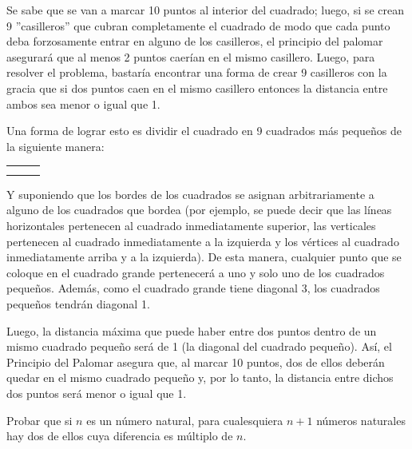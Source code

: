 \documentclass[12pt]{article}
\begin{document}
\begin{solucion}
    Se sabe que se van a marcar 10 puntos al interior del cuadrado; luego, si se crean 9 ''casilleros'' que cubran completamente el cuadrado de modo que cada punto deba forzosamente entrar en alguno de los casilleros, el principio del palomar asegurará que al menos 2 puntos caerían en el mismo casillero. Luego, para resolver el problema, bastaría encontrar una forma de crear 9 casilleros con la gracia que si dos puntos caen en el mismo casillero entonces la distancia entre ambos sea menor o igual que 1.
    
    \newpage
    
    Una forma de lograr esto es dividir el cuadrado en 9 cuadrados más pequeños de la siguiente manera:

    \begin{center}
        \begin{tabular}{|p{0.35cm}|p{0.35cm}|p{0.35cm}|}
        \hline
         &  &  \\ \hline
         &  &  \\ \hline
         &  &  \\ \hline
        \end{tabular}
    \end{center}

    Y suponiendo que los bordes de los cuadrados se asignan arbitrariamente a alguno de los cuadrados que bordea (por ejemplo, se puede decir que las líneas horizontales pertenecen al cuadrado inmediatamente superior, las verticales pertenecen al cuadrado inmediatamente a la izquierda y los vértices al cuadrado inmediatamente arriba y a la izquierda). De esta manera, cualquier punto que se coloque en el cuadrado grande pertenecerá a uno y solo uno de los cuadrados pequeños. Además, como el cuadrado grande tiene diagonal 3, los cuadrados pequeños tendrán diagonal 1.

    Luego, la distancia máxima que puede haber entre dos puntos dentro de un mismo cuadrado pequeño será de 1 (la diagonal del cuadrado pequeño). Así, el Principio del Palomar asegura que, al marcar 10 puntos, dos de ellos deberán quedar en el mismo cuadrado pequeño y, por lo tanto, la distancia entre dichos dos puntos será menor o igual que 1.
\end{solucion}

\begin{ejemplo}
    Probar que si $n$ es un número natural, para cualesquiera $n+1$ números naturales hay dos de ellos cuya diferencia es múltiplo de $n$.
\end{ejemplo}
\end{document}
